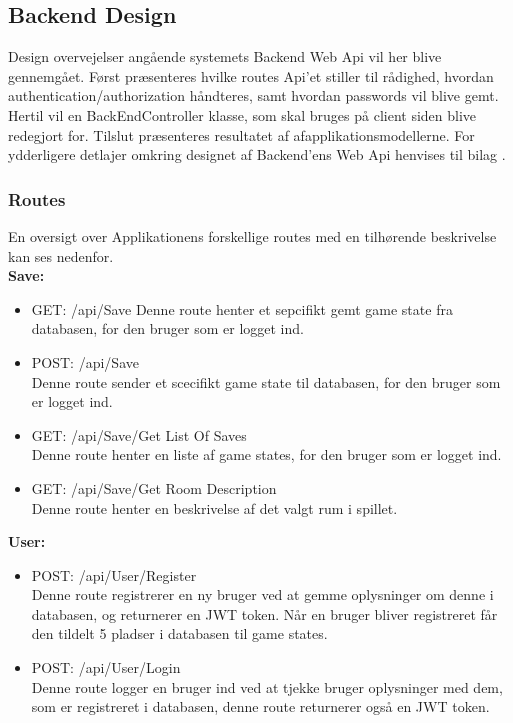 \subsection{Backend Design}
\label{ssec: Backend Design}
Design overvejelser  angående systemets Backend Web Api vil her blive gennemgået. Først præsenteres hvilke routes Api'et stiller til rådighed, hvordan authentication/authorization håndteres, samt hvordan passwords vil blive gemt. Hertil vil en BackEndController klasse, som skal bruges på client siden blive redegjort for. Tilslut præsenteres resultatet af afapplikationsmodellerne. For ydderligere detlajer omkring designet af Backend'ens Web Api henvises til bilag \parencite[][Section 10.4]{TekniskBilag}.

\subsubsection{Routes}
En oversigt over Applikationens forskellige routes med en tilhørende beskrivelse kan ses nedenfor.\\

\textbf{Save:}\\
\begin{itemize}
\item GET: /api/Save
Denne route henter et sepcifikt gemt game state fra databasen, for den bruger som er logget ind.
\item POST: /api/Save\\
Denne route sender et scecifikt game state til databasen, for den bruger som er logget ind.
\item GET: /api/Save/Get List Of Saves\\
Denne route henter en liste af game states, for den bruger som er logget ind. 
\item GET: /api/Save/Get Room Description\\
Denne route henter en beskrivelse af det valgt rum i spillet.
\end{itemize}

\textbf{User:}\\
\begin{itemize}
\item POST: /api/User/Register\\
Denne route registrerer en ny bruger ved at gemme oplysninger om denne i databasen, og returnerer en JWT token. Når en bruger bliver registreret får den tildelt 5 pladser i databasen til game states.
\item POST: /api/User/Login\\
Denne route logger en bruger ind ved at tjekke bruger oplysninger med dem, som er registreret i databasen, denne route returnerer også en JWT token.
\end{itemize}


